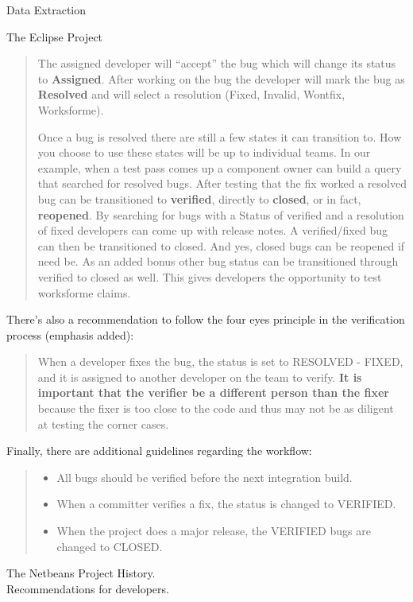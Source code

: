 \begin{section}{Data Extraction}
\begin{subsection}{The Eclipse Project}
\begin{quote}
	The assigned developer will “accept” the bug which will change its status to \textbf{Assigned}. After working on the bug the developer will mark the bug as \textbf{Resolved} and will select a resolution (Fixed, Invalid, Wontfix, Worksforme).

	Once a bug is resolved there are still a few states it can transition to. How you choose to use these states will be up to individual teams. In our example, when a test pass comes up a component owner can build a query that searched for resolved bugs. After testing that the fix worked a resolved bug can be transitioned to \textbf{verified}, directly to \textbf{closed}, or in fact, \textbf{reopened}. By searching for bugs with a Status of verified and a resolution of fixed developers can come up with release notes. A verified/fixed bug can then be transitioned to closed. And yes, closed bugs can be reopened if need be. As an added bonus other bug status can be transitioned through verified to closed as well. This gives developers the opportunity to test worksforme claims.
	\end{quote}

	There’s also a recommendation to follow the four eyes principle in the verification process (emphasis added):

	\begin{quote}
	When a developer fixes the bug, the status is set to RESOLVED - FIXED, and it is assigned to another developer on the team to verify. \textbf{It is important that the verifier be a different person than the fixer} because the fixer is too close to the code and thus may not be as diligent at testing the corner cases.
	\end{quote}

	Finally, there are additional guidelines regarding the workflow:

	\begin{quote}
		\begin{itemize}
	\item All bugs should be verified before the next integration build.

	\item When a committer verifies a fix, the status is changed to VERIFIED.

	\item When the project does a major release, the VERIFIED bugs are changed to CLOSED.
		\end{itemize}
	\end{quote}
\end{subsection}

\begin{subsection}{The Netbeans Project}
	History. \\
	Recommendations for developers.
\end{subsection}

\end{section}

